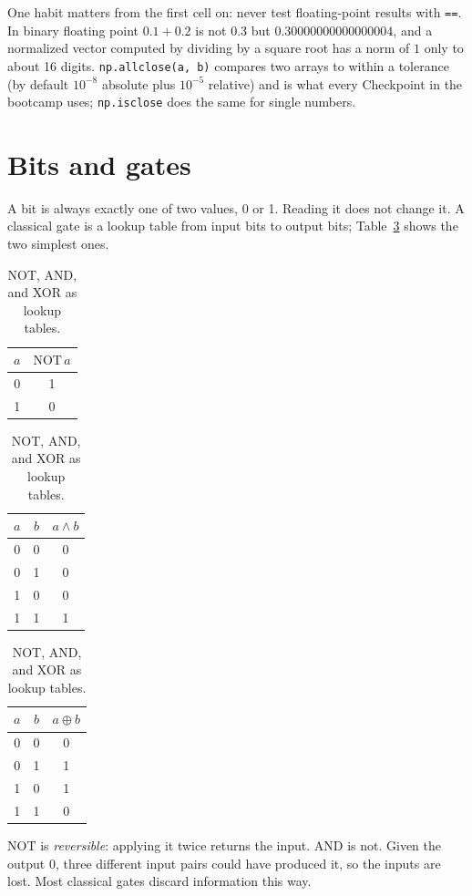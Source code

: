 \documentclass[11pt]{article}
\newcommand{\code}[1]{\texttt{#1}}
\begin{document}
One habit matters from the first cell on: never test floating-point results with \code{==}. In binary floating point $0.1 + 0.2$ is not $0.3$ but $0.30000000000000004$, and a normalized vector computed by dividing by a square root has a norm of $1$ only to about 16 digits. \code{np.allclose(a, b)} compares two arrays to within a tolerance (by default $10^{-8}$ absolute plus $10^{-5}$ relative) and is what every Checkpoint in the bootcamp uses; \code{np.isclose} does the same for single numbers.

\section{Bits and gates}

A bit is always exactly one of two values, 0 or 1. Reading it does not change it. A classical gate is a lookup table from input bits to output bits; Table~\ref{tab:gates} shows the two simplest ones.

\begin{table}[h]
\centering
\small
\begin{tabular}{@{}cc@{}}
\toprule
$a$ & $\mathrm{NOT}\,a$ \\
\midrule
0 & 1 \\
1 & 0 \\
\bottomrule
\end{tabular}
\qquad\qquad
\begin{tabular}{@{}ccc@{}}
\toprule
$a$ & $b$ & $a \wedge b$ \\
\midrule
0 & 0 & 0 \\
0 & 1 & 0 \\
1 & 0 & 0 \\
1 & 1 & 1 \\
\bottomrule
\end{tabular}
\qquad\qquad
\begin{tabular}{@{}ccc@{}}
\toprule
$a$ & $b$ & $a \oplus b$ \\
\midrule
0 & 0 & 0 \\
0 & 1 & 1 \\
1 & 0 & 1 \\
1 & 1 & 0 \\
\bottomrule
\end{tabular}
\caption{NOT, AND, and XOR as lookup tables.}
\label{tab:gates}
\end{table}

NOT is \emph{reversible}: applying it twice returns the input. AND is not. Given the output 0, three different input pairs could have produced it, so the inputs are lost. Most classical gates discard information this way.
\end{document}
